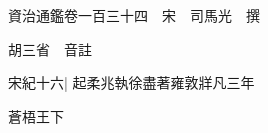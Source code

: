 






























































資治通鑑卷一百三十四　宋　司馬光　撰

胡三省　音註

宋紀十六|{
	起柔兆執徐盡著雍敦牂凡三年}


蒼梧王下

